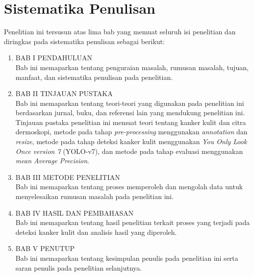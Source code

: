     \section{Sistematika Penulisan}
    Penelitian ini tersusun atas lima bab yang memuat seluruh isi penelitian dan diringkas pada sistematika penulisan sebagai berikut:
    \begin{enumerate}
        \item BAB I PENDAHULUAN\\
        Bab ini memaparkan tentang penguraian masalah, rumusan masalah, tujuan, manfaat, dan sistematika penulisan pada penelitian.
        \item BAB II TINJAUAN PUSTAKA\\
        Bab ini memaparkan tentang teori-teori yang digunakan pada penelitian ini berdasarkan jurnal, buku, dan referensi lain yang mendukung penelitian ini. Tinjauan pustaka penelitian ini memuat teori tentang kanker kulit dan citra dermoskopi, metode pada tahap \textit{pre-processing} menggunakan \textit{annotation} dan \textit{resize}, metode pada tahap deteksi kanker kulit menggunakan \textit{You Only Look Once version 7} (YOLO-v7), dan metode pada tahap evaluasi menggunakan \textit{mean Average Precision}.
        \item BAB III METODE PENELITIAN\\
        Bab ini memaparkan tentang proses memperoleh dan mengolah data untuk menyelesaikan rumusan masalah pada penelitian ini.
        \item BAB IV HASIL DAN PEMBAHASAN\\
        Bab ini memaparkan tentang hasil penelitian terkait proses yang terjadi pada deteksi kanker kulit dan analisis hasil yang diperoleh.
        \item BAB V PENUTUP\\
        Bab ini memaparkan tentang kesimpulan penulis pada penelitian ini serta saran penulis pada penelitian selanjutnya.
    \end{enumerate}